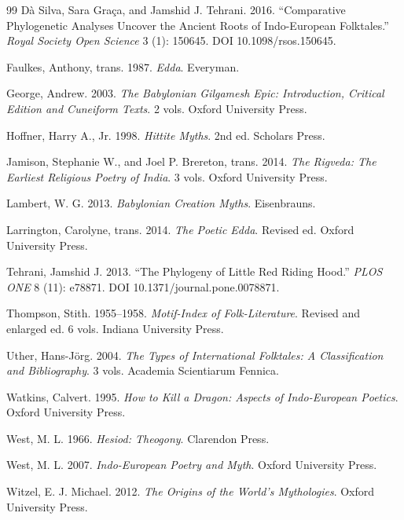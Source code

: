 \documentclass[11pt]{article}
\DeclareRobustCommand{\_}{\textunderscore\allowbreak}
\begin{document}
\begin{thebibliography}{99}
D\`{a} Silva, Sara Gra\c{c}a, and Jamshid J. Tehrani. 2016.
``Comparative Phylogenetic Analyses Uncover the Ancient Roots of Indo-European Folktales.''
\emph{Royal Society Open Science} 3 (1): 150645. DOI 10.1098/rsos.150645.

Faulkes, Anthony, trans. 1987. \emph{Edda}. Everyman.

George, Andrew. 2003. \emph{The Babylonian Gilgamesh Epic: Introduction, Critical Edition and Cuneiform Texts}.
2 vols. Oxford University Press.

Hoffner, Harry A., Jr. 1998. \emph{Hittite Myths}. 2nd ed. Scholars Press.

Jamison, Stephanie W., and Joel P. Brereton, trans. 2014.
\emph{The Rigveda: The Earliest Religious Poetry of India}. 3 vols. Oxford University Press.

Lambert, W. G. 2013. \emph{Babylonian Creation Myths}. Eisenbrauns.

Larrington, Carolyne, trans. 2014. \emph{The Poetic Edda}. Revised ed. Oxford University Press.

Tehrani, Jamshid J. 2013. ``The Phylogeny of Little Red Riding Hood.''
\emph{PLOS ONE} 8 (11): e78871. DOI 10.1371/journal.pone.0078871.

Thompson, Stith. 1955--1958. \emph{Motif-Index of Folk-Literature}.
Revised and enlarged ed. 6 vols. Indiana University Press.

Uther, Hans-J\"{o}rg. 2004. \emph{The Types of International Folktales: A Classification and Bibliography}.
3 vols. Academia Scientiarum Fennica.

Watkins, Calvert. 1995. \emph{How to Kill a Dragon: Aspects of Indo-European Poetics}. Oxford University Press.

West, M. L. 1966. \emph{Hesiod: Theogony}. Clarendon Press.

West, M. L. 2007. \emph{Indo-European Poetry and Myth}. Oxford University Press.

Witzel, E. J. Michael. 2012. \emph{The Origins of the World's Mythologies}. Oxford University Press.
\end{thebibliography}
\end{document}
